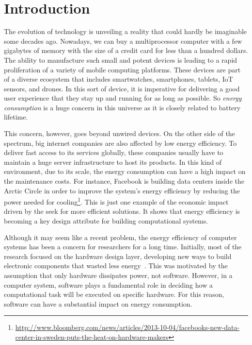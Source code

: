 \chapter{Introduction}\label{chp:introduction}


The evolution of technology is unveiling a reality that could hardly be imaginable some decades ago. Nowadays, we can buy a multiprocessor computer with a few gigabytes of memory with the size of a credit card for less than a hundred dollars. The ability to manufacture such small and potent devices is leading to a rapid proliferation of a variety of mobile computing platforms. These devices are part of a diverse ecosystem that includes smartwatches, smartphones, tablets, IoT sensors, and drones. In this sort of device, it is imperative for delivering a good user experience that they stay up and running for as long as possible. So \emph{energy consumption} is a huge concern in this universe as it is closely related to battery lifetime. %

This concern, however, goes beyond unwired devices. On the other side of the spectrum, big internet companies are also affected by low energy efficiency. To deliver fast access to its services globally, these companies usually have to maintain a huge server infrastructure to host its products. In this kind of environment, due to its scale, the energy consumption can have a high impact on the maintenance costs. For instance, Facebook is building data centers inside the Arctic Circle in order to improve the system's energy efficiency by reducing the power needed for cooling\footnote{\scriptsize\url{http://www.bloomberg.com/news/articles/2013-10-04/facebooks-new-data-center-in-sweden-puts-the-heat-on-hardware-makers}}. This is just one example of the economic impact driven by the seek for more efficient solutions. It shows that energy efficiency is becoming a key design attribute for building computational systems.

Although it may seem like a recent problem, the energy efficiency of computer systems has been a concern for researchers for a long time. Initially, most of the research focused on the hardware design layer, developing new ways to build electronic components that wasted less energy~\cite{chandrakasan:1992}. This was motivated by the assumption that only hardware dissipates power, not software. However, in a computer system, software plays a fundamental role in deciding how a computational task will be executed on specific hardware. For this reason, software can have a substantial impact on energy consumption.

